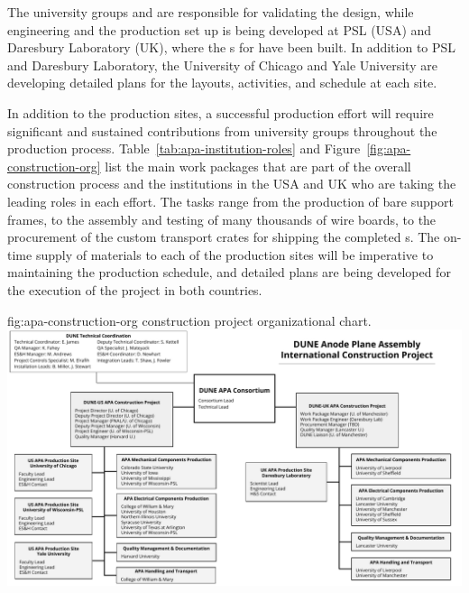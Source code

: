 The university groups and  are responsible for validating  the design, while engineering and the production set up is being developed at PSL %
(USA) and Daresbury Laboratory (UK), where the s for  have been built. 
In addition to PSL and Daresbury Laboratory, the University of Chicago and Yale University are developing detailed plans for the layouts, activities, and schedule at each site. 


In addition to the  production sites, a successful production effort will require significant and sustained contributions from university groups throughout the production process.  Table~\ref{tab:apa-institution-roles} and Figure~\ref{fig:apa-construction-org} list the main work packages that are part of the overall  construction process and the institutions in the USA and UK who are taking the leading roles in each effort.  The tasks range from the production of bare support frames, to the assembly and testing of many thousands of wire boards, to the procurement of the custom transport crates for shipping the completed s.  The on-time supply of materials to each of the  production sites will be imperative to maintaining the production schedule, and detailed plans are being developed for the execution of the project in both countries. 



\begin{dunefigure}{fig:apa-construction-org}
{ construction project organizational chart.}
\includegraphics[width=1\textwidth,trim=0mm 0mm 0mm 0mm,clip]{graphics/sp-apa-construction-org-chart.pdf}
\end{dunefigure}

